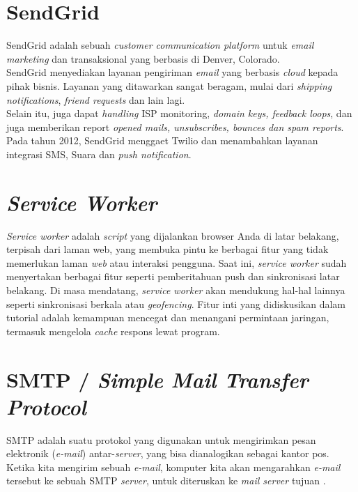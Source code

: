 	\section{  SendGrid}
	SendGrid adalah sebuah \textit{customer communication platform} untuk \textit{email} \textit{marketing} dan transaksional yang berbasis di Denver, Colorado.
	\\ \indent
	SendGrid menyediakan layanan pengiriman \textit{email} yang berbasis \textit{cloud} kepada pihak bisnis. Layanan yang ditawarkan sangat beragam, mulai dari \textit{shipping notifications}, \textit{friend requests} dan lain lagi. \\ \indent
	Selain itu, juga dapat \textit{handling} ISP monitoring, \textit{domain keys, feedback loops}, dan juga memberikan report \textit{opened mails, unsubscribes, bounces dan spam reports}. Pada tahun 2012, SendGrid menggaet Twilio dan menambahkan layanan integrasi SMS, Suara dan \textit{push notification}\cite{wikipedia_sendgrid_2017}.
	
	\section{  \textit{Service Worker}}
	\textit{Service worker }adalah \textit{script} yang dijalankan browser Anda di latar belakang, terpisah dari laman web, yang membuka pintu ke berbagai fitur yang tidak memerlukan laman \textit{web} atau interaksi pengguna. Saat ini, \textit{service worker} sudah menyertakan berbagai fitur seperti pemberitahuan push dan sinkronisasi latar belakang. Di masa mendatang, \textit{service worker} akan mendukung hal-hal lainnya seperti sinkronisasi berkala atau \textit{geofencing}. Fitur inti yang didiskusikan dalam tutorial adalah kemampuan mencegat dan menangani permintaan jaringan, termasuk mengelola \textit{cache} respons lewat program\cite{google_developers_service_2017}.
	
	\section{  SMTP / \textit{Simple Mail Transfer Protocol}}
	SMTP adalah suatu protokol yang digunakan untuk mengirimkan pesan elektronik (\textit{e-mail}) antar-\textit{server}, yang bisa dianalogikan sebagai kantor pos. Ketika kita mengirim sebuah \textit{e-mail}, komputer kita akan mengarahkan \textit{e-mail} tersebut ke sebuah SMTP \textit{server}, untuk diteruskan ke \textit{mail server} tujuan \cite{noauthor_smtp_nodate}. 
	
